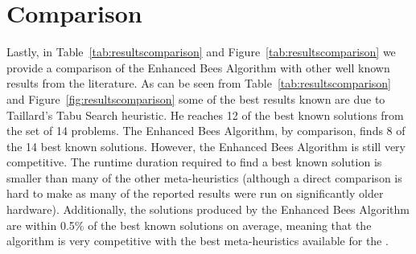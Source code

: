 \section{Comparison}
\label{sec:comparison}

Lastly, in Table~\ref{tab:resultscomparison} and Figure~\ref{tab:resultscomparison} we provide a comparison of the Enhanced Bees Algorithm with other well known results from the literature. As can be seen from Table~\ref{tab:resultscomparison} and Figure~\ref{fig:resultscomparison} some of the best results known are due to Taillard's Tabu Search heuristic. He reaches 12 of the best known solutions from the set of 14 problems. The Enhanced Bees Algorithm, by comparison, finds 8 of the 14 best known solutions. However, the Enhanced Bees Algorithm is still very competitive. The runtime duration required to find a best known solution is smaller than many of the other meta-heuristics (although a direct comparison is hard to make as many of the reported results were run on significantly older hardware). Additionally, the solutions produced by the Enhanced Bees Algorithm are within 0.5\% of the best known solutions on average, meaning that the algorithm is very competitive with the best meta-heuristics available for the \VRP.

